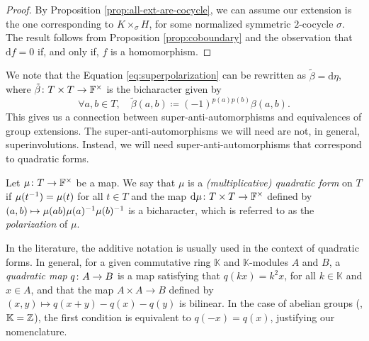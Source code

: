 \begin{proof}
	By Proposition \ref{prop:all-ext-are-cocycle}, we can assume our extension is the one corresponding to $K \times_\sigma H$, for some normalized symmetric $2$-cocycle $\sigma$.
	The result follows from Proposition \ref{prop:coboundary} and the observation that $\mathrm{d}f = 0$ if, and only if, $f$ is a homomorphism.
\end{proof}

We note that the Equation \eqref{eq:superpolarization} can be rewritten as $\tilde\beta = \mathrm{d}\eta$, where $\tilde\beta\colon T\times T \to \mathbb{F}^\times$ is the bicharacter given by
\begin{equation}\label{eq:def-beta-tilde}
	\forall a,b\in T,\quad \tilde\beta(a,b) \coloneqq (-1)^{p(a)p(b)}\beta(a,b).
\end{equation}
This gives us a connection between super-anti-automorphisms and equivalences of group extensions.
The super-anti-automorphisms we will need are not, in general, superinvolutions.
Instead, we will need super-anti-automorphisms that correspond to quadratic forms.

\begin{defi}
	Let $\mu\colon T \to \mathbb{F}^\times$ be a map.
	We say that $\mu$ is a \emph{(multiplicative) quadratic form} on $T$ if $\mu(t^{-1}) = \mu (t)$ for all $t\in T$ and the map $\mathrm{d}\mu\colon T\times T \to \mathbb{F}^\times$ defined by
	$(a,b) \mapsto \mu(ab) \mu(a)^{-1} \mu(b)^{-1}$
	is a bicharacter, which is referred to as the \emph{polarization} of $\mu$.
\end{defi}

\begin{remark}
	In the literature, the additive notation is usually used in the context of quadratic forms.
	In general, for a given commutative ring $\mathbb K$ and $\mathbb K$-modules $A$ and $B$, a \emph{quadratic map} $q\colon A \to B$ is a map satisfying that $q(kx) = k^2 x$, for all $k\in \mathbb K$ and $x \in A$, and that the map $A \times A \to B$ defined by $(x,y) \mapsto q(x+y) - q(x) - q(y)$ is bilinear.
	In the case of abelian groups (\ie, $\mathbb K = \mathbb{Z}$), the first condition is equivalent to $q(-x) = q(x)$, justifying our nomenclature.
\end{remark}


